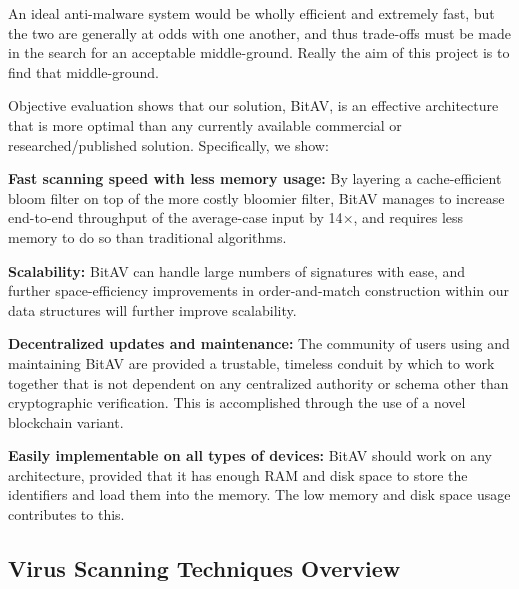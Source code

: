 \documentclass[12pt,journal]{IEEEtran}
\begin{document}
An ideal anti-malware system would be wholly efficient and extremely fast, but the two are generally at odds with one another, and thus trade-offs must be made in the search for an acceptable middle-ground. Really the aim of this project is to find that middle-ground.\par


Objective evaluation shows that our solution, BitAV, is an effective architecture that is more optimal than any currently available commercial or researched/published solution. Specifically, we show:
\begin{itemize}[\label={}]
    \item \textbf{Fast scanning speed with less memory usage:} By layering a cache-efficient bloom filter on top of the more costly bloomier filter, BitAV manages to increase end-to-end throughput of the average-case input by 14$\times{}$, and requires less memory to do so than traditional algorithms. 
    \item \textbf{Scalability:} BitAV can handle large numbers of signatures with ease, and further space-efficiency improvements in order-and-match construction within our data structures will further improve scalability.
    \item \textbf{Decentralized updates and maintenance:} The community of users using and maintaining BitAV are provided a trustable, timeless conduit by which to work together that is not dependent on any centralized authority or schema other than cryptographic verification. This is accomplished through the use of a novel blockchain variant.
    \item \textbf{Easily implementable on all types of devices:} BitAV should work on any architecture, provided that it has enough RAM and disk space to store the identifiers and load them into the memory. The low memory and disk space usage contributes to this.
\end{itemize}\par


\subsection{Virus Scanning Techniques Overview}
\end{document}

